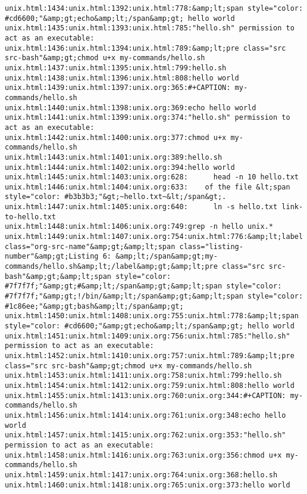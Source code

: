 \documentclass[11pt]{article}
\begin{document}
\begin{verbatim}
unix.html:1434:unix.html:1392:unix.html:778:&amp;lt;span style="color: #cd6600;"&amp;gt;echo&amp;lt;/span&amp;gt; hello world
unix.html:1435:unix.html:1393:unix.html:785:"hello.sh" permission to act as an executable:
unix.html:1436:unix.html:1394:unix.html:789:&amp;lt;pre class="src src-bash"&amp;gt;chmod u+x my-commands/hello.sh
unix.html:1437:unix.html:1395:unix.html:799:hello.sh
unix.html:1438:unix.html:1396:unix.html:808:hello world
unix.html:1439:unix.html:1397:unix.org:365:#+CAPTION: my-commands/hello.sh
unix.html:1440:unix.html:1398:unix.org:369:echo hello world
unix.html:1441:unix.html:1399:unix.org:374:"hello.sh" permission to act as an executable:
unix.html:1442:unix.html:1400:unix.org:377:chmod u+x my-commands/hello.sh
unix.html:1443:unix.html:1401:unix.org:389:hello.sh
unix.html:1444:unix.html:1402:unix.org:394:hello world
unix.html:1445:unix.html:1403:unix.org:628:      head -n 10 hello.txt
unix.html:1446:unix.html:1404:unix.org:633:    of the file &lt;span style="color: #b3b3b3;"&gt;~hello.txt~&lt;/span&gt;.
unix.html:1447:unix.html:1405:unix.org:640:      ln -s hello.txt link-to-hello.txt
unix.html:1448:unix.html:1406:unix.org:749:grep -n hello unix.*
unix.html:1449:unix.html:1407:unix.org:754:unix.html:776:&amp;lt;label class="org-src-name"&amp;gt;&amp;lt;span class="listing-number"&amp;gt;Listing 6: &amp;lt;/span&amp;gt;my-commands/hello.sh&amp;lt;/label&amp;gt;&amp;lt;pre class="src src-bash"&amp;gt;&amp;lt;span style="color: #7f7f7f;"&amp;gt;#&amp;lt;/span&amp;gt;&amp;lt;span style="color: #7f7f7f;"&amp;gt;!/bin/&amp;lt;/span&amp;gt;&amp;lt;span style="color: #1c86ee;"&amp;gt;bash&amp;lt;/span&amp;gt;
unix.html:1450:unix.html:1408:unix.org:755:unix.html:778:&amp;lt;span style="color: #cd6600;"&amp;gt;echo&amp;lt;/span&amp;gt; hello world
unix.html:1451:unix.html:1409:unix.org:756:unix.html:785:"hello.sh" permission to act as an executable:
unix.html:1452:unix.html:1410:unix.org:757:unix.html:789:&amp;lt;pre class="src src-bash"&amp;gt;chmod u+x my-commands/hello.sh
unix.html:1453:unix.html:1411:unix.org:758:unix.html:799:hello.sh
unix.html:1454:unix.html:1412:unix.org:759:unix.html:808:hello world
unix.html:1455:unix.html:1413:unix.org:760:unix.org:344:#+CAPTION: my-commands/hello.sh
unix.html:1456:unix.html:1414:unix.org:761:unix.org:348:echo hello world
unix.html:1457:unix.html:1415:unix.org:762:unix.org:353:"hello.sh" permission to act as an executable:
unix.html:1458:unix.html:1416:unix.org:763:unix.org:356:chmod u+x my-commands/hello.sh
unix.html:1459:unix.html:1417:unix.org:764:unix.org:368:hello.sh
unix.html:1460:unix.html:1418:unix.org:765:unix.org:373:hello world

\end{verbatim}
\end{document}
